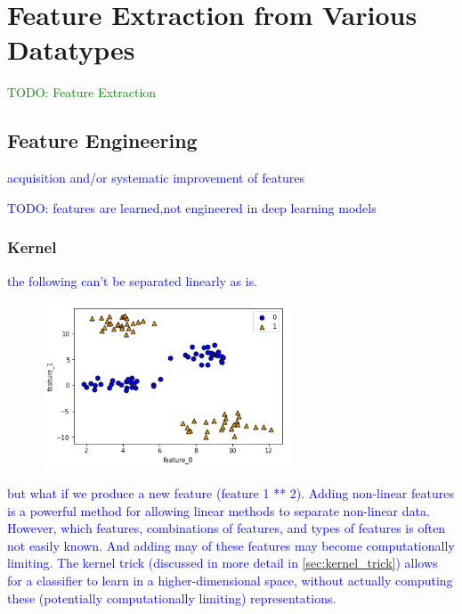 \section{Feature Extraction from Various Datatypes}

\textcolor{green}{TODO: Feature Extraction}

\subsection{Feature Engineering}

\textcolor{blue}{acquisition and/or systematic improvement of features}

\textcolor{blue}{TODO: features are learned,not engineered in deep learning models}

\subsubsection{Kernel}

\textcolor{blue}{the following can't be separated linearly as is.}

\begin{figure}
\centering
\includegraphics[width=0.65\textwidth]{./sync_imgs/kernelized/2class4clust/2dimg.png}
\label{fig:kernelized_2class4clust_2dimg}
\end{figure}

\textcolor{blue}{but what if we produce a new feature (feature 1 ** 2). Adding non-linear features is a powerful method for allowing linear methods to separate non-linear data. However, which features, combinations of features, and types of features is often not easily known. And adding may of these features may become computationally limiting. The {kernel trick} (discussed in more detail in \ref{sec:kernel_trick}) allows for a classifier to learn in a higher-dimensional space, without actually computing these (potentially computationally limiting) representations.}

